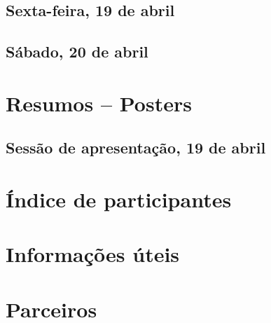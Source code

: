 \documentclass[openany, parskip=full, 12pt, a4]{scrbook}
\begin{document}




\section{Sexta-feira, 19 de abril}

\section{Sábado, 20 de abril}

\chapter{Resumos -- Posters} 

\vspace{-2.5em}

\section{Sessão de apresentação, 19 de abril}




\chapter{Índice de participantes}
 

 
\chapter{Informações úteis}



\chapter{Parceiros}



\newpage


\pagecolor{myblue}
\thispagestyle{empty}
\mbox{}
\end{document}
